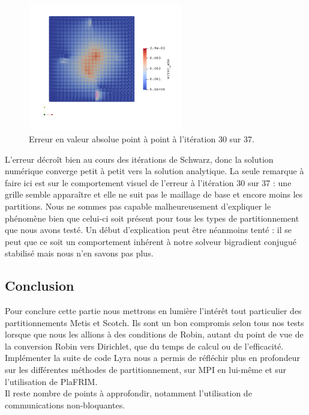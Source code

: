 \documentclass[a4paper,11pt]{article}
\begin{document}
\begin{figure}[H]
	\centering
	\includegraphics[width=0.6\textwidth]{metis_200_200_30_err.png}
	\caption{Erreur en valeur absolue point à point à l'itération 30 sur 37.}
\end{figure}
\noindent L'erreur décroît bien au cours des itérations de Schwarz, donc la solution numérique converge petit à petit vers la solution analytique. La seule remarque à faire ici est sur le comportement visuel de l'erreur à l'itération 30 sur 37 : une grille semble apparaître et elle ne suit pas le maillage de base et encore moins les partitions. Nous ne sommes pas capable malheureusement d'expliquer le phénomène bien que celui-ci soit présent pour tous les types de partitionnement que nous avons testé. Un début d'explication peut être néanmoins tenté : il se peut que ce soit un comportement inhérent à notre solveur bigradient conjugué stabilisé mais nous n'en savons pas plus.

\subsection{Conclusion}
\noindent Pour conclure cette partie nous mettrons en lumière l'intérêt tout particulier des partitionnements Metis et Scotch. Ils sont un bon compromis selon tous nos tests lorsque que nous les allions à des conditions de Robin, autant du point de vue de la conversion Robin vers Dirichlet, que du temps de calcul ou de l'efficacité.\\
Implémenter la suite de code Lyra nous a permis de réfléchir plus en profondeur sur les différentes méthodes de partitionnement, sur MPI en lui-même et sur l'utilisation de PlaFRIM.\\
Il reste nombre de points à approfondir, notamment l'utilisation de communications non-bloquantes.
\newpage
\listoffigures

%		
\end{document}
